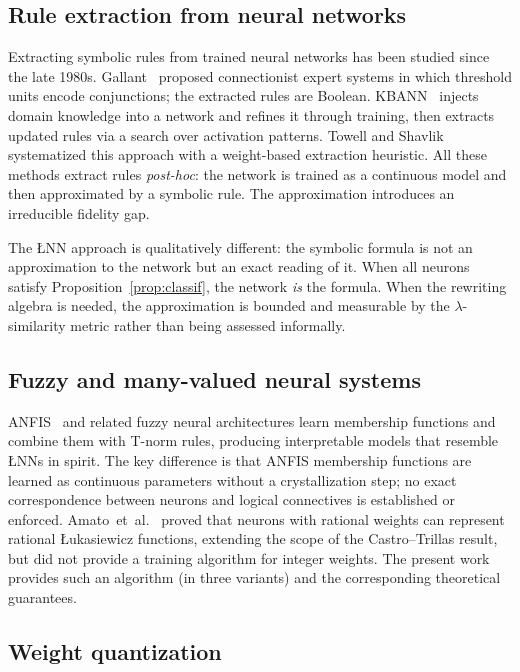 \documentclass[10pt,a4paper,twoside]{article}
\newcommand{\LNN}{\L{}NN}
\begin{document}
\subsection{Rule extraction from neural networks}

Extracting symbolic rules from trained neural networks has been studied since
the late 1980s.
Gallant~\cite{gallant1988} proposed connectionist expert systems in which
threshold units encode conjunctions; the extracted rules are Boolean.
KBANN~\cite{towell1994} injects domain knowledge into a network and refines it
through training, then extracts updated rules via a search over activation patterns.
Towell and Shavlik~\cite{towell1993} systematized this approach with a
weight-based extraction heuristic.
All these methods extract rules \emph{post-hoc}: the network is trained as a
continuous model and then approximated by a symbolic rule.
The approximation introduces an irreducible fidelity gap.

The \LNN{} approach is qualitatively different: the symbolic formula is not an
approximation to the network but an exact reading of it.
When all neurons satisfy Proposition~\ref{prop:classif}, the network \emph{is}
the formula.
When the rewriting algebra is needed, the approximation is bounded and
measurable by the $\lambda$-similarity metric rather than being assessed
informally.

\subsection{Fuzzy and many-valued neural systems}

ANFIS~\cite{jang1993} and related fuzzy neural architectures learn
membership functions and combine them with T-norm rules, producing interpretable
models that resemble \LNN{}s in spirit.
The key difference is that ANFIS membership functions are learned as continuous
parameters without a crystallization step; no exact correspondence between
neurons and logical connectives is established or enforced.
Amato~et~al.~\cite{amato2002} proved that neurons with rational weights can
represent rational \L{}ukasiewicz functions, extending the scope of the
Castro--Trillas result, but did not provide a training algorithm for integer
weights.
The present work provides such an algorithm (in three variants) and the
corresponding theoretical guarantees.

\subsection{Weight quantization}
\end{document}
